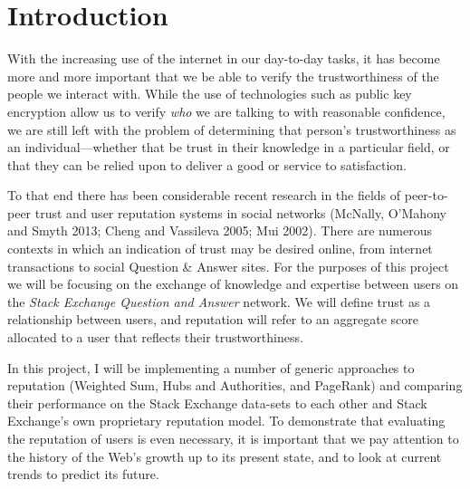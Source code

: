 \documentclass[]{final_report}
\begin{document}


\tableofcontents{}\newpage


\chapter{Introduction}

With the increasing use of the internet in our day-to-day tasks, it has become more and more important that we be able to verify the trustworthiness of the people we interact with. While the use of technologies such as public key encryption allow us to verify \textsl{who} we are talking to with reasonable confidence, we are still left with the problem of determining that person's trustworthiness as an individual---whether that be trust in their knowledge in a particular field, or that they can be relied upon to deliver a good or service to satisfaction.

To that end there has been considerable recent research in the fields of peer-to-peer trust and user reputation systems in social networks (McNally, O'Mahony and Smyth 2013; Cheng and Vassileva 2005; Mui 2002). There are numerous contexts in which an indication of trust may be desired online, from internet transactions to social Question \& Answer sites. For the purposes of this project we will be focusing on the exchange of knowledge and expertise between users on the \textsl{Stack Exchange Question and Answer} network. We will define trust as a relationship between users, and reputation will refer to an aggregate score allocated to a user that reflects their trustworthiness.

In this project, I will be implementing a number of generic approaches to reputation (Weighted Sum, Hubs and Authorities, and PageRank) and comparing their performance on the Stack Exchange data-sets to each other and Stack Exchange's own proprietary reputation model. To demonstrate that evaluating the reputation of users is even necessary, it is important that we pay attention to the history of the Web's growth up to its present state, and to look at current trends to predict its future.
\end{document}
